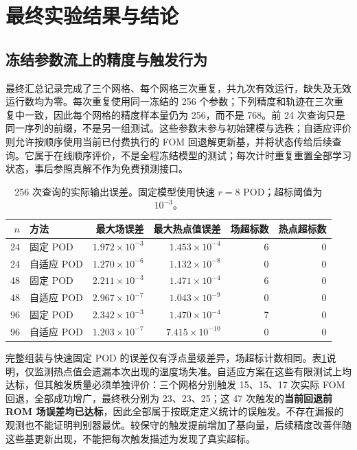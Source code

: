 \section{最终实验结果与结论}
\subsection{冻结参数流上的精度与触发行为}
最终汇总记录完成了三个网格、每个网格三次重复，共九次有效运行，缺失及无效运行数均为零。每次重复使用同一冻结的 256 个参数；下列精度和轨迹在三次重复中一致，因此每个网格的精度样本量仍为 256，而不是 768。前 24 次查询只是同一序列的前缀，不是另一组测试。这些参数未参与初始建模与选秩；自适应评价则允许按顺序使用当前已付费执行的 FOM 回退解更新基，并将状态传给后续查询。它属于在线顺序评价，不是全程冻结模型的测试；每次计时重复重置全部学习状态，事后参照真解不作为免费预测接口。

\begin{table}[htbp]
\centering\small
\caption{256 次查询的实际输出误差。固定模型使用快速 $r=8$ POD；超标阈值为 $10^{-3}$。}
\label{tab:final-accuracy}
\begin{tabular}{rlrrrr}
\toprule
$n$ & 方法 & 最大场误差 & 最大热点值误差 & 场超标数 & 热点超标数\\
\midrule
24 & 固定 POD & $1.972\times10^{-3}$ & $1.453\times10^{-4}$ & 6 & 0\\
24 & 自适应 POD & $1.270\times10^{-6}$ & $1.132\times10^{-8}$ & 0 & 0\\
48 & 固定 POD & $2.211\times10^{-3}$ & $1.471\times10^{-4}$ & 6 & 0\\
48 & 自适应 POD & $2.967\times10^{-7}$ & $1.043\times10^{-9}$ & 0 & 0\\
96 & 固定 POD & $2.342\times10^{-3}$ & $1.470\times10^{-4}$ & 7 & 0\\
96 & 自适应 POD & $1.203\times10^{-7}$ & $7.415\times10^{-10}$ & 0 & 0\\
\bottomrule
\end{tabular}
\end{table}

完整组装与快速固定 POD 的误差仅有浮点量级差异，场超标计数相同。表\ref{tab:final-accuracy}说明，仅监测热点值会遗漏本次出现的温度场失准。自适应方案在这些有限测试上均达标，但其触发质量必须单独评价：三个网格分别触发 15、15、17 次实际 FOM 回退，全部成功增广，最终秩分别为 23、23、25；这 47 次触发的\textbf{当前回退前 ROM 场误差均已达标}，因此全部属于按既定定义统计的误触发。不存在漏报的观测也不能证明判别器最优。较保守的触发提前增加了基向量，后续精度改善伴随这些基更新出现，不能把每次触发描述为发现了真实超标。

